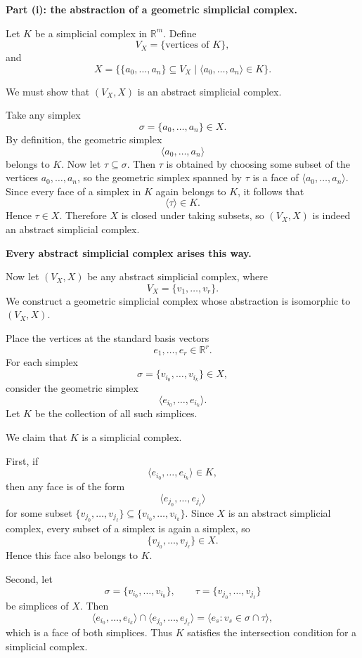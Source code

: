 \begin{solution}
\textbf{Part (i): the abstraction of a geometric simplicial complex.}

Let \(K\) be a simplicial complex in \(\mathbb R^m\). Define
\[
V_X=\{\text{vertices of }K\},
\]
and
\[
X=\bigl\{\{a_0,\dots,a_n\}\subseteq V_X \mid \langle a_0,\dots,a_n\rangle\in K\bigr\}.
\]

We must show that \((V_X,X)\) is an abstract simplicial complex.

Take any simplex
\[
\sigma=\{a_0,\dots,a_n\}\in X.
\]
By definition, the geometric simplex
\[
\langle a_0,\dots,a_n\rangle
\]
belongs to \(K\). Now let \(\tau\subseteq \sigma\). Then \(\tau\) is obtained by choosing some subset of the vertices \(a_0,\dots,a_n\), so the geometric simplex spanned by \(\tau\) is a face of \(\langle a_0,\dots,a_n\rangle\). Since every face of a simplex in \(K\) again belongs to \(K\), it follows that
\[
\langle \tau\rangle\in K.
\]
Hence \(\tau\in X\). Therefore \(X\) is closed under taking subsets, so \((V_X,X)\) is indeed an abstract simplicial complex.

\par

\textbf{Every abstract simplicial complex arises this way.}

Now let \((V_X,X)\) be any abstract simplicial complex, where
\[
V_X=\{v_1,\dots,v_r\}.
\]
We construct a geometric simplicial complex whose abstraction is isomorphic to \((V_X,X)\).

Place the vertices at the standard basis vectors
\[
e_1,\dots,e_r\in \mathbb R^r.
\]
For each simplex
\[
\sigma=\{v_{i_0},\dots,v_{i_k}\}\in X,
\]
consider the geometric simplex
\[
\langle e_{i_0},\dots,e_{i_k}\rangle.
\]
Let \(K\) be the collection of all such simplices.

We claim that \(K\) is a simplicial complex.

First, if
\[
\langle e_{i_0},\dots,e_{i_k}\rangle\in K,
\]
then any face is of the form
\[
\langle e_{j_0},\dots,e_{j_\ell}\rangle
\]
for some subset \(\{v_{j_0},\dots,v_{j_\ell}\}\subseteq \{v_{i_0},\dots,v_{i_k}\}\). Since \(X\) is an abstract simplicial complex, every subset of a simplex is again a simplex, so
\[
\{v_{j_0},\dots,v_{j_\ell}\}\in X.
\]
Hence this face also belongs to \(K\).

Second, let
\[
\sigma=\{v_{i_0},\dots,v_{i_k}\},\qquad \tau=\{v_{j_0},\dots,v_{j_\ell}\}
\]
be simplices of \(X\). Then
\[
\langle e_{i_0},\dots,e_{i_k}\rangle\cap \langle e_{j_0},\dots,e_{j_\ell}\rangle
=
\langle e_s : v_s\in \sigma\cap\tau\rangle,
\]
which is a face of both simplices. Thus \(K\) satisfies the intersection condition for a simplicial complex.


\end{solution}
